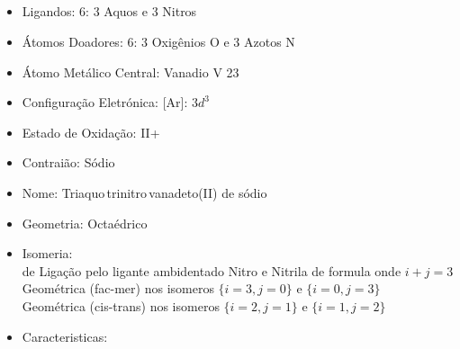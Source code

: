 \documentclass[12pt]{article}
\begin{document}
	\subsection{}
	\begin{itemize}
   
   
   \item Ligandos: 6: 3 Aquos  e 3 Nitros 
   
   
   \item Átomos Doadores: 6: 3 Oxigênios O e 3 Azotos N
   
   \item Átomo Metálico Central: Vanadio V 23
   
   \item Configuração Eletrónica: [Ar]: $ 3d^3 $
   
   \item Estado de Oxidação: II+
   
   \item Contraião: Sódio 
   
   \item Nome: Triaquo\,trinitro\,vanadeto(II) de sódio
   
   \item Geometria: Octaédrico
   
   \item Isomeria:\\
   	de Ligação pelo ligante ambidentado Nitro  e Nitrila  de formula  onde $i+j=3$\\
		Geométrica (fac-mer) nos isomeros $\{i=3, j=0\}$ e $\{i=0, j=3\}$\\
		Geométrica (cis-trans) nos isomeros $\{i=2,j=1\}$ e $\{i=1,j=2\}$

	\item Caracteristicas:

	\end{itemize}
	
\break

\setcounter{subsection}{18}

\end{document}
